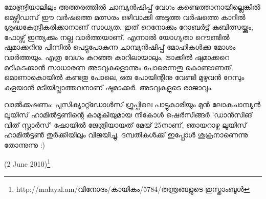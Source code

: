 മോണ്ട്രിയാലിലും അത്തരത്തില്‍ ചാമ്പ്യന്‍ഷിപ്പ് വേഗം കണ്ടെത്താനായില്ലെങ്കില്‍ മെഴ്സിഡസ് ഈ വര്‍ഷത്തെ മത്സരം 
ഒഴിവാക്കി അടുത്ത വര്‍ഷത്തെ കാറില്‍ ശ്രദ്ധകേന്ദ്രീകരിക്കാനാണ് സാധ്യത. ഇത് റെനോക്കും റോബര്‍ട്ട് കുബിത്സയ്ക്കും, 
ഫോഴ്സ് ഇന്ത്യക്കും നല്ല വാര്‍ത്തയാണ്. എന്നാല്‍ യോഗ്യതാ റൌണ്ടില്‍ ഷുമാക്കറിനു പിന്നില്‍ പെട്ടുപോകുന്ന 
ചാമ്പ്യന്‍ഷിപ്പ് മോഹികള്‍ക്കു മോശം വാര്‍ത്തയും. എത്ര വേഗം കുറഞ്ഞ കാറിലായാലും, ട്രാക്കില്‍ ഷുമാക്കറെ മറികടക്കാന്‍
സാധാരണ അടവുകളൊന്നും പോരെന്നതു കൊണ്ടാണത്. മൊണാകൊയില്‍ കണ്ടതു പോലെ, ഒരു പോയിന്റിനു വേണ്ടി 
മുഴുവന്‍ റേസും കളയാന്‍ മടിയില്ലാത്തവനാണ് ഷുമാക്കര്‍. അടവുകളുടെ രാജാവും.

വാല്‍ക്കഷണം: പുസിക്യാറ്റ്ഡോള്‍സ് ഗ്രൂപ്പിലെ പാട്ടുകാരിയും മുന്‍ ലോകചാമ്പ്യന്‍ ലൂയിസ് ഹാമില്‍ട്ടണിന്റെ 
കാമുകിയുമായ നികോള്‍ ഷെര്‍സിങ്ങര്‍ 'ഡാന്‍സിങ് വിത് സ്റ്റാര്‍സ്' ഷോയില്‍ ജേത്രിയായത് മേയ് 25നാണ്, 
ഞായറാഴ്ച ലൂയിസ് ഹാമില്‍ട്ടണ്‍ തുര്‍ക്കിയിലും വിജയിച്ചു. ദമ്പതികള്‍ക്ക് ഇപ്പോള്‍ ശുക്രനാണെന്നു തോന്നുന്നു :)

(2 June 2010)\footnote{http://malayal.am/വിനോദം/കായികം/5784/തന്ത്രങ്ങളുടെ-ഇസ്താംബൂള്‍}

\newpage
